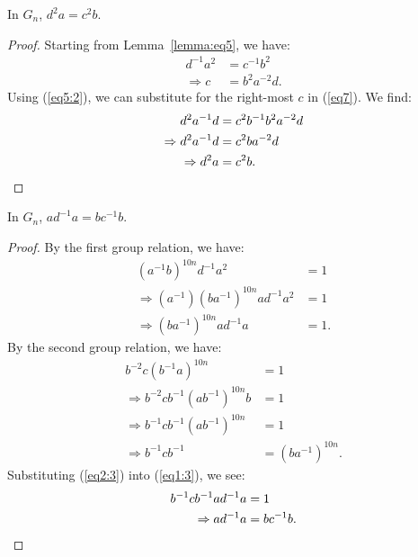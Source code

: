 \begin{lemma} In $G_n$, $d^{2}a=c^{2}b$.
\label{lemma:eq8}
\end{lemma}
\begin{proof}
Starting from Lemma~\ref{lemma:eq5}, we have:
\begin{align}
d^{-1}a^{2}&=c^{-1}b^{2}\nonumber{}\\
\Rightarrow{}c&=b^{2}a^{-2}d.\label{eq5:2}
\end{align}
Using (\ref{eq5:2}), we can substitute for the right-most $c$ in (\ref{eq7}). We find:
\begin{align*}
d^{2}a^{-1}d&=c^{2}b^{-1}b^{2}a^{-2}d\\
\Rightarrow{}d^{2}a^{-1}d&=c^{2}ba^{-2}d\\
\Rightarrow{}d^{2}a&=c^{2}b.\qedhere
\end{align*}
\end{proof}

\begin{lemma} In $G_n$, $ad^{-1}a=bc^{-1}b$.
\label{lemma:eq16}
\end{lemma}
\begin{proof} By the first group relation, we have:
\begin{align}
(a^{-1}b)^{10n}d^{-1}a^{2}&=1\nonumber{}\\
\Rightarrow{}(a^{-1})(ba^{-1})^{10n}ad^{-1}a^{2}&=1\nonumber{}\\
\Rightarrow{}(ba^{-1})^{10n}ad^{-1}a&=1.\label{eq1:3}
\end{align}
By the second group relation, we have:
\begin{align}
b^{-2}c(b^{-1}a)^{10n}&=1\nonumber{}\\
\Rightarrow{} b^{-2}cb^{-1}(ab^{-1})^{10n}b&=1\nonumber{}\\
\Rightarrow{}b^{-1}cb^{-1}(ab^{-1})^{10n}&=1\nonumber{}\\
\Rightarrow{}b^{-1}cb^{-1}&=(ba^{-1})^{10n}.\label{eq2:3}
\end{align}
Substituting (\ref{eq2:3}) into (\ref{eq1:3}), we see:
\begin{align*}
b^{-1}cb^{-1}ad^{-1}a&=1\\
\Rightarrow{}ad^{-1}a&=bc^{-1}b.\qedhere
\end{align*}
\end{proof}

